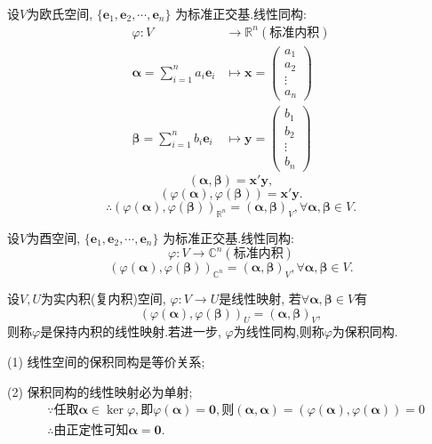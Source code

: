 设$V$为欧氏空间, $\{\bm{e}_1,\bm{e}_2,\cdots,\bm{e}_n\}$
为标准正交基.线性同构:
\begin{align*}
  \varphi: V & \longrightarrow \mathbb{R}^n(\text{标准内积})\\
  \bm{\alpha}=\sum_{i=1}^n a_i\bm{e}_i & \longmapsto \bm{x} = \begin{pmatrix}
    a_1\\
    a_2\\
    \vdots\\
    a_n
  \end{pmatrix}\\
  \bm{\beta}=\sum_{i=1}^n b_i\bm{e}_i & \longmapsto \bm{y} = \begin{pmatrix}
    b_1\\
    b_2\\
    \vdots\\
    b_n
  \end{pmatrix}
\end{align*}
\[
  (\bm{\alpha},\bm{\beta}) = \bm{x}'\bm{y},
\]
\[
  (\varphi(\bm{\alpha}),\varphi(\bm{\beta})) = \bm{x}'\bm{y}.
\]
\[
  \therefore (\varphi(\bm{\alpha}),\varphi(\bm{\beta}))_{\mathbb{R}^n}
  = (\bm{\alpha},\bm{\beta})_V, \forall \bm{\alpha},\bm{\beta} \in V.
\]

设$V$为酉空间, $\{\bm{e}_1,\bm{e}_2,\cdots,\bm{e}_n\}$
为标准正交基.线性同构:
\[
  \varphi: V  \longrightarrow \mathbb{C}^n(\text{标准内积})
\]
\[
  (\varphi(\bm{\alpha}),\varphi(\bm{\beta}))_{\mathbb{C}^n}
  = (\bm{\alpha},\bm{\beta})_V, \forall \bm{\alpha},\bm{\beta} \in V.
\]

\begin{definition}
  设$V, U$为实内积(复内积)空间, $\varphi: V \longrightarrow U$是线性映射,
  若$\forall \bm{\alpha},\bm{\beta} \in V$有
  \[
    (\varphi(\bm{\alpha}),\varphi(\bm{\beta}))_U = (\bm{\alpha},\bm{\beta})_V,
  \]
  则称$\varphi$是保持内积的线性映射.若进一步,
  $\varphi$为线性同构,则称$\varphi$为保积同构.
\end{definition}

\begin{notice}
  (1) 线性空间的保积同构是等价关系;

  (2) 保积同构的线性映射必为单射;
  \begin{align*}
    & \because \text{任取}\bm{\alpha}\in \ker\varphi,
    \text{即}\varphi(\bm{\alpha})=\bm{0},
    \text{则}(\bm{\alpha},\bm{\alpha}) =
      (\varphi(\bm{\alpha}),\varphi(\bm{\alpha})) = 0\\
    & \therefore \text{由正定性可知}\bm{\alpha} = \bm{0}.
  \end{align*}
\end{notice}

